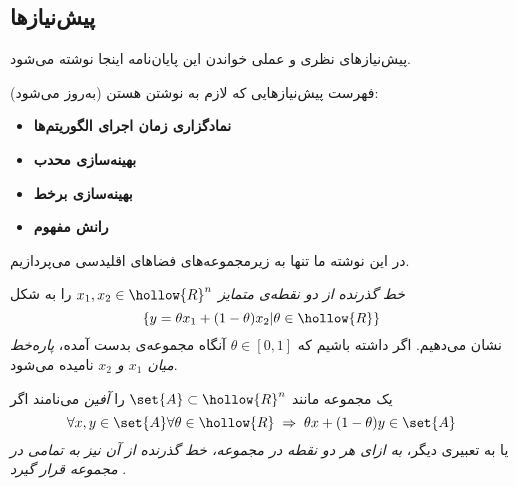 \documentclass[a4paper,11px]{article}
\newcommand{\basepath}{../}
\begin{document}
\subsection{
پیش‌نیازها
}

پیش‌نیازهای نظری و عملی خواندن این پایان‌نامه اینجا نوشته می‌شود.


فهرست پیش‌نیازهایی که لازم به نوشتن هستن (به‌روز می‌شود):
\begin{itemize}
\item {\bf
نمادگزاری زمان اجرای الگوریتم‌ها
}


\item {\bf
بهینه‌سازی محدب
}

\item {\bf
بهینه‌سازی برخط
}

\item {\bf
رانش مفهوم
}

\end{itemize}












در این نوشته ما تنها به زیرمجموعه‌های فضاهای اقلیدسی می‌پردازیم.

\textit{
خط گذرنده از دو نقطه‌ی متمایز 
$x_1, x_2 \in \hollow{R}^n$} 
را به شکل
\[
\left\lbrace y = \theta x_1 + (1 - \theta ) x_2 | \theta \in \hollow{R} \right\rbrace
\]
نشان می‌دهیم. اگر داشته باشیم که 
$\theta \in [0,1]$ 
آنگاه مجموعه‌ی بدست آمده، 
\textit{
پاره‌خط میان 
$x_1$ 
و 
$x_2$} 
نامیده می‌شود.


یک مجموعه مانند 
$\set{A} \subset \hollow{R}^n$ 
را 
\textit{
آفین
} 
می‌نامند اگر
\[
\forall x,y \in \set{A} \forall \theta \in \hollow{R} \; \Rightarrow \; \theta x + (1-\theta) y \in \set{A}
\]
یا به تعبیری دیگر، 
\textit{
به ازای هر دو نقطه در مجموعه، خط گذرنده از آن نیز به تمامی در مجموعه قرار گیرد
}. 

\end{document}

